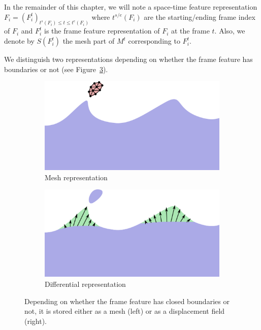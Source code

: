In the remainder of this chapter, we will note a space-time feature representation $F_{i} = \left( F_{i}^{t} \right)_{t^{s}\left(F_{i}\right) \leq t \leq t^{e}\left(F_{i}\right)}$ where $t^{s/e}(F_{i})$ are the starting/ending frame index of $F_{i}$ and $F_{i}^{t}$ is the frame feature representation of $F_{i}$ at the frame $t$. 
Also, we denote by $S(F_{i}^{t})$ the mesh part of $M^{t}$ corresponding to $F_{i}^{t}$.

We distinguish two representations depending on whether the frame feature has boundaries or not (see Figure~\ref{fig:feature_representation}). 
\begin{figure}[h!]
	\centering
	\label{fig:featureRepresentation}
	\begin{subfigure}[b]{0.46\linewidth}
		\centering
		\includegraphics[width=\textwidth]{images/fluidsculpting-mig2016/isolatedFeature.png}
		\caption{\label{fig:feature_representation:mesh}Mesh representation}
	\end{subfigure}
	\hspace{0.1cm}
	\begin{subfigure}[b]{0.46\linewidth}
		\centering
		\includegraphics[width=\textwidth]{images/fluidsculpting-mig2016/detailFeature.png}
		\caption{\label{fig:feature_representation:displacement}Differential representation}
	\end{subfigure}
	\caption[Fluid sculpting: Feature representation]{
		Depending on whether the frame feature has closed boundaries or not, it is stored either as a mesh (left) or as a displacement field (right).}
	\label{fig:feature_representation}
\end{figure}


